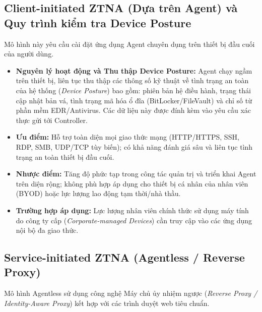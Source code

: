 \subsection{Client-initiated ZTNA (Dựa trên Agent) và Quy trình kiểm tra Device Posture}
\label{subsec:3_3_1}

Mô hình này yêu cầu cài đặt ứng dụng Agent chuyên dụng trên thiết bị đầu cuối của người dùng.

\begin{itemize}
    \item \textbf{Nguyên lý hoạt động và Thu thập Device Posture:} Agent chạy ngầm trên thiết bị, liên tục thu thập các thông số kỹ thuật về tình trạng an toàn của hệ thống (\textit{Device Posture}) bao gồm: phiên bản hệ điều hành, trạng thái cập nhật bản vá, tình trạng mã hóa ổ đĩa (BitLocker/FileVault) và chỉ số từ phần mềm EDR/Antivirus. Các dữ liệu này được đính kèm vào yêu cầu xác thực gửi tới Controller.
    \item \textbf{Ưu điểm:} Hỗ trợ toàn diện mọi giao thức mạng (HTTP/HTTPS, SSH, RDP, SMB, UDP/TCP tùy biến); có khả năng đánh giá sâu và liên tục tình trạng an toàn thiết bị đầu cuối.
    \item \textbf{Nhược điểm:} Tăng độ phức tạp trong công tác quản trị và triển khai Agent trên diện rộng; không phù hợp áp dụng cho thiết bị cá nhân của nhân viên (BYOD) hoặc lực lượng lao động tạm thời/nhà thầu.
    \item \textbf{Trường hợp áp dụng:} Lực lượng nhân viên chính thức sử dụng máy tính do công ty cấp (\textit{Corporate-managed Devices}) cần truy cập vào các ứng dụng nội bộ đa giao thức.
\end{itemize}

\subsection{Service-initiated ZTNA (Agentless / Reverse Proxy)}
\label{subsec:3_3_2}

Mô hình Agentless sử dụng công nghệ Máy chủ ủy nhiệm ngược (\textit{Reverse Proxy / Identity-Aware Proxy}) kết hợp với các trình duyệt web tiêu chuẩn.

